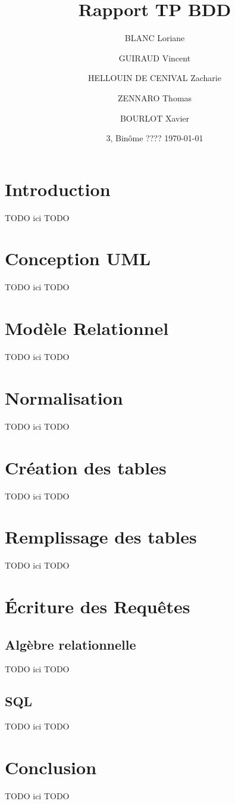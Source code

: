 \documentclass[french]{article}
\title{Rapport TP BDD}
\author{ BLANC Loriane \and GUIRAUD Vincent \and HELLOUIN DE CENIVAL Zacharie \and ZENNARO Thomas \and  BOURLOT Xavier}
\date{3\bsc{Imacs-ae-c}, Binôme ???? \bigbreak \today}
\begin{document}
\maketitle

\tableofcontents

\newpage

\section{Introduction}
TODO ici TODO

\section{Conception UML}
TODO ici TODO

\section{Modèle Relationnel}
TODO ici TODO

\section{Normalisation}
TODO ici TODO

\section{Création des tables}
TODO ici TODO

\section{Remplissage des tables}
TODO ici TODO

\section{Écriture des Requêtes}
\subsection{Algèbre relationnelle}
TODO ici TODO

\subsection{SQL}
TODO ici TODO

\section{Conclusion}
TODO ici TODO
\end{document}
